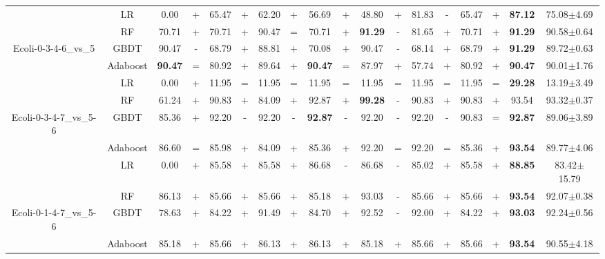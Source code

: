 \documentclass[journal]{IEEEtran}
\begin{document}
\begin{table*}
\begin{threeparttable}
\begin{tabular}{|c|c|cc|cc|cc|cc|cc|cc|cc|cc|}
			& LR    & 0.00  & +     & 65.47  & +     & 62.20  & +     & 56.69  & +     & 48.80  & +     & 81.83  & -     & 65.47  & +     & \textbf{87.12}  & 75.08$\pm$4.69  \\
			& RF    & 70.71  & +     & 70.71  & +     & 90.47  & =     & 70.71  & +     & \textbf{91.29}  & -     & 81.65  & +     & 70.71  & +     & \textbf{91.29}  & 90.58$\pm$0.64  \\
			Ecoli-0-3-4-6\_vs\_5
			& GBDT  & 90.47  & -     & 68.79  & +     & 88.81  & +     & 70.08  & +     & 90.47  & -     & 68.14  & +     & 68.79  & +     & \textbf{91.29}  & 89.72$\pm$0.63  \\
			& Adaboost & \textbf{90.47}  & =     & 80.92  & +     & 89.64  & +     & \textbf{90.47}  & =     & 87.97  & +     & 57.74  & +     & 80.92  & +     & \textbf{90.47}  & 90.01$\pm$1.76  \\
			\hline
			
			& LR    & 0.00  & +     & 11.95  & =     & 11.95  & =     & 11.95  & =     & 11.95  & =     & 11.95  & =     & 11.95  & =     & \textbf{29.28}  & 13.19$\pm$3.49  \\
			& RF    & 61.24  & +     & 90.83  & +     & 84.09  & +     & 92.87  & +     & \textbf{99.28}  & -     & 90.83  & +     & 90.83  & +     & 93.54  & 93.32$\pm$0.37  \\
			Ecoli-0-3-4-7\_vs\_5-6
			& GBDT  & 85.36  & +     & 92.20  & -     & 92.20  & -     & \textbf{92.87}  & -     & 92.20  & -     & 92.20  & -     & 90.83  & =     & \textbf{92.87}  & 89.06$\pm$3.89  \\
			& Adaboost & 86.60  & =     & 85.98  & +     & 84.09  & +     & 85.36  & +     & 92.20  & =     & 92.20  & =     & 85.36  & +     & \textbf{93.54}  & 89.77$\pm$4.06  \\
			\hline
			
			& LR    & 0.00  & +     & 85.58  & +     & 85.58  & +     & 86.68  & -     & 86.68  & -     & 85.02  & +     & 85.58  & +     & \textbf{88.85}  & 83.42$\pm$15.79  \\
			& RF    & 86.13  & +     & 85.66  & +     & 85.66  & +     & 85.18  & +     & 93.03  & -     & 85.66  & +     & 85.66  & +     & \textbf{93.54}  & 92.07$\pm$0.38  \\
			Ecoli-0-1-4-7\_vs\_5-6
			& GBDT  & 78.63  & +     & 84.22  & +     & 91.49  & +     & 84.70  & +     & 92.52  & -     & 92.00  & +     & 84.22  & +     & \textbf{93.03}  & 92.24$\pm$0.56  \\
			& Adaboost & 85.18  & +     & 85.66  & +     & 86.13  & +     & 86.13  & +     & 85.18  & +     & 85.66  & +     & 85.66  & +     & \textbf{93.54}  & 90.55$\pm$4.18  \\
			\hline
			

\end{tabular}
\end{threeparttable}
\end{table*}
\end{document}
